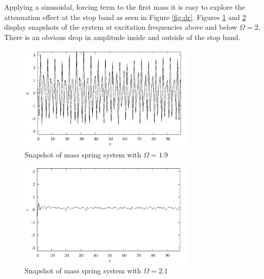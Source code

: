 \documentclass{article}
\begin{document}
Applying a sinusoidal, forcing term to the first mass it is easy to explore the 
attenuation effect at the stop band as seen in Figure \ref{fig:dr}. Figures 
\ref{fig:snap19} and \ref{fig:snap21} display snapshots of the system at 
excitation frequencies above and below $\Omega=2$. There is an obvious drop in 
amplitude inside and outside of the stop band.
\begin{figure}[!htbp]
	\centering
	\includegraphics[width=0.75\textwidth]{snap-f19.pdf}
	\caption{Snapshot of mass spring system with $\Omega=1.9$}
	\label{fig:snap19}
\end{figure}
\begin{figure}[!htbp]
	\centering
	\includegraphics[width=0.75\textwidth]{snap-f21.pdf}
	\caption{Snapshot of mass spring system with $\Omega=2.1$}
	\label{fig:snap21}
\end{figure}
\end{document}
